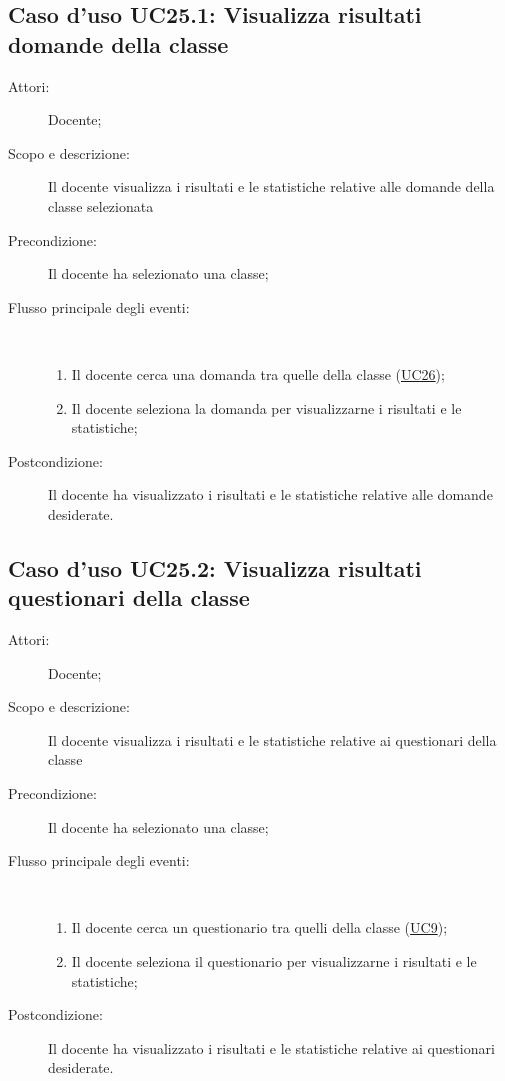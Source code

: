 \subsection{Caso d'uso UC25.1: Visualizza risultati domande della classe}\begin{description}
\item[Attori:] Docente;
\item[Scopo e descrizione:] Il docente visualizza i risultati e le statistiche relative alle domande della classe selezionata
      \item[Precondizione:] Il docente ha selezionato una classe;

        \item[Flusso principale degli eventi:] \ 
 \begin{enumerate}
          \item Il docente cerca una domanda tra quelle della classe (\hyperlink{UC26}{UC26});
          \item Il docente seleziona la domanda per visualizzarne i risultati e le statistiche;

      \end{enumerate}
    \item[Postcondizione:] Il docente ha visualizzato i risultati e le statistiche relative alle domande desiderate.
  \end{description}
\hypertarget{UC25.2}{}
\subsection{Caso d'uso UC25.2: Visualizza risultati questionari della classe}\begin{description}
\item[Attori:] Docente;
\item[Scopo e descrizione:] Il docente visualizza i risultati e le statistiche relative ai questionari della classe
      \item[Precondizione:] Il docente ha selezionato una classe;

        \item[Flusso principale degli eventi:] \ 
 \begin{enumerate}
          \item Il docente cerca un questionario tra quelli della classe (\hyperlink{UC9}{UC9});
          \item Il docente seleziona il questionario per visualizzarne i risultati e le statistiche;

      \end{enumerate}
    \item[Postcondizione:] Il docente ha visualizzato i risultati e le statistiche relative ai questionari desiderate.
  \end{description}
\hypertarget{UC25.3}{}
